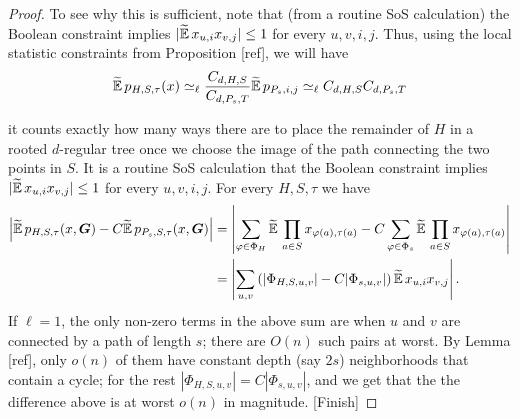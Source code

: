 \begin{proof}
    To see why this is sufficient, note that (from a routine SoS calculation) the Boolean constraint implies $|\widetilde{\operatorname*{\mathbb{E}}}\, x_{u,i}x_{v,j}| \le 1$ for every $u,v,i,j$. Thus, using the local statistic constraints from Proposition [ref], we will have
    $$
        \widetilde{\operatorname*{\mathbb{E}}}\, p_{H,S,\tau}(x) \simeq_\ell \frac{C_{d,H,S}}{C_{d,P_s,T}}\widetilde{\operatorname*{\mathbb{E}}}\, p_{P_s,i,j} \simeq_\ell {C_{d,H,S}}{C_{d,P_s,T}} 
    $$


    it counts exactly how many ways there are to place the remainder of $H$ in a rooted $d$-regular tree once we choose the image of the path connecting the two points in $S$. It is a routine SoS calculation that the Boolean constraint implies $|\widetilde{\operatorname*{\mathbb{E}}}\, x_{u,i}x_{v,j}| \le 1$ for every $u,v,i,j$. For every $H,S,\tau$ we have
    \begin{align*}
        \left|\widetilde{\operatorname*{\mathbb{E}}}\, p_{H,S,\tau}(x,\boldsymbol{G}) - C\widetilde{\operatorname*{\mathbb{E}}}\, p_{P_s,S,\tau}(x,\boldsymbol{G}) \right|
        &= \left|\sum_{\varphi \in \Phi_H}\widetilde{\operatorname*{\mathbb{E}}}\, \prod_{a\in S} x_{\varphi(a),\tau(a)} - C\sum_{\varphi \in \Phi_s}\widetilde{\operatorname*{\mathbb{E}}}\, \prod_{a\in S}x_{\varphi(a),\tau(a)}\right| \\
        &= \left|\sum_{u,v}\left(|\Phi_{H,S,u,v}| - C|\Phi_{s,u,v}|\right)\widetilde{\operatorname*{\mathbb{E}}}\, x_{u,i}x_{v,j}\right|.
    \end{align*}
    If $\ell = 1$, the only non-zero terms in the above sum are when $u$ and $v$ are connected by a path of length $s$; there are $O(n)$ such pairs at worst. By Lemma [ref], only $o(n)$ of them have constant depth (say $2s$) neighborhoods that contain a cycle; for the rest $|\Phi_{H,S,u,v}| = C|\Phi_{s,u,v}|$, and we get that the the difference above is at worst $o(n)$ in magnitude. [Finish]
\end{proof}
    
